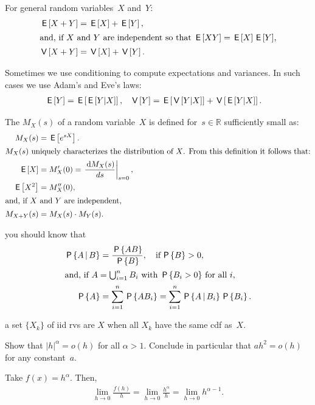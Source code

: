 \documentclass[queueing-book.tex]{subfiles}
\begin{document}
For general random variables~$X$ and~$Y$:
\begin{align*}
  \,\mathsf{E}\left[X+Y\right] &= \,\mathsf{E}\left[X\right] + \,\mathsf{E}\left[Y\right], \\
\intertext{and, if~$X$ and~$Y$ are independent so that $\,\mathsf{E}\left[XY\right] = \,\mathsf{E}\left[X\right] \,\mathsf{E}\left[Y\right]$,}
  \,\mathsf{V}\left[X+Y\right] &= \,\mathsf{V}\left[X\right] + \,\mathsf{V}\left[Y\right].
\end{align*}

Sometimes we use conditioning to compute  expectations and variances. In such cases we use Adam's and Eve's laws:
\begin{align*}
\,\mathsf{E}\left[Y\right] &= \,\mathsf{E}\left[\,\mathsf{E}\left[Y|X\right]\right], & \,\mathsf{V}\left[Y\right] &= \,\mathsf{E}\left[\,\mathsf{V}\left[Y|X\right]\right] + \,\mathsf{V}\left[\,\mathsf{E}\left[Y|X\right]\right].
\end{align*}


The  $M_X(s)$ of a random variable~$X$ is defined for~$s\in \mathbb{R}$ sufficiently small as:
\begin{subequations}
\begin{align}
 M_X(s) &= \,\mathsf{E}\left[e^{s X}\right]. \label{eq:75}\\
\intertext{$M_X(s)$  uniquely characterizes the distribution of~$X$. From this definition it follows that:}
 \,\mathsf{E}\left[X\right] &= M_{X}'(0) = \left.\frac{\,\textrm{d}M_{X}(s)}{d s}\right|_{s=0},\label{eq:69}\\
\,\mathsf{E}\left[X^2\right] &= M_{X}''(0), \label{eq:64}\\
\intertext{and, if~$X$ and~$Y$ are independent,}
M_{X+Y}(s) &= M_X(s)\cdot M_Y(s). \label{eq:73}
\end{align}
\end{subequations}


 you should know that
\begin{subequations}\label{eq:70}
\begin{align}
\,\mathsf{P}\left\{A\,\middle|\, B\right\} & = \frac{\,\mathsf{P}\left\{AB\right\}}{\,\mathsf{P}\left\{B\right\}}, \quad\text{if}\, \,\mathsf{P}\left\{B\right\}>0, \\
\intertext{and, if $A=\bigcup_{i=1}^n B_i$ with $\,\mathsf{P}\left\{B_i>0\right\}$ for all~$i$,}
 \,\mathsf{P}\left\{A\right\} &= \sum_{i=1}^n \,\mathsf{P}\left\{A B_i\right\} = \sum_{i=1}^n \,\mathsf{P}\left\{A\,\middle|\, B_i\right\} \,\mathsf{P}\left\{B_i\right\}.
\end{align}
\end{subequations}

 a set $\{X_k\}$ of iid rvs are  $X$ when all $X_k$ have the same cdf as~$X$.

\begin{exercise}\label{ex:12}
Show that $|h|^{\alpha} = o(h)$ for all $\alpha > 1$. Conclude in particular that $a h^{2} = o(h)$ for any constant~$a$.
\begin{solution}
Take $f(x) = h^{\alpha}$. Then,
\begin{align*}
\lim_{h\to 0} \frac{f(h)}{h} =
\lim_{h\to 0} \frac{h^{\alpha}}{h} =
\lim_{h\to 0} h^{\alpha-1}.
\end{align*}
\end{solution}
\end{exercise}
\end{document}
